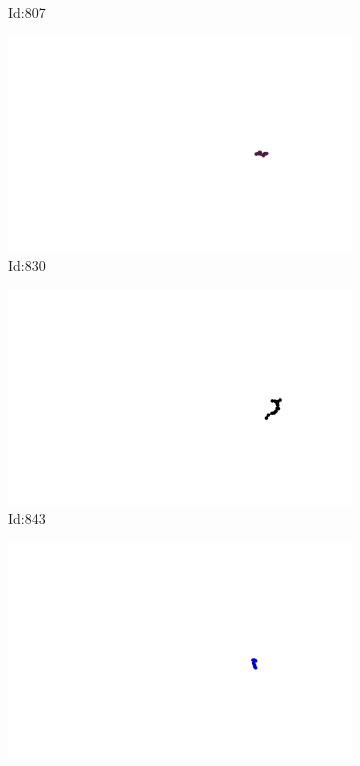 \documentclass[12pt,twoside]{report}
\begin{document}
\begin{figure}
\begin{subfigure}[b]{0.20\textwidth}
\caption{Id:807}
\end{subfigure}
\begin{subfigure}[b]{0.20\textwidth}
\centering
\includegraphics[width=\textwidth]{../trajectories/830.png}
\caption{Id:830}
\end{subfigure}
\begin{subfigure}[b]{0.20\textwidth}
\centering
\includegraphics[width=\textwidth]{../trajectories/843.png}
\caption{Id:843}
\end{subfigure}
\begin{subfigure}[b]{0.20\textwidth}
\centering
\includegraphics[width=\textwidth]{../trajectories/875.png}

\end{subfigure}
\end{figure}
\end{document}
